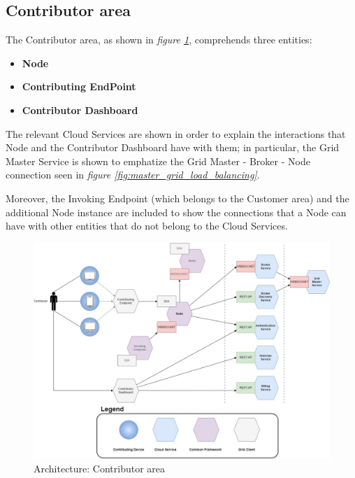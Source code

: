 \subsection{Contributor area}\label{contributor_area}
The Contributor area, as shown in \textit{figure \ref{fig:architecture_contributor}}, comprehends three entities:
\begin{itemize}
    \item \textbf{Node}
    \item \textbf{Contributing EndPoint}
    \item \textbf{Contributor Dashboard}
\end{itemize}
The relevant Cloud Services are shown in order to explain the interactions that Node and the Contributor Dashboard have with them; in particular, the Grid Master Service is shown to emphatize the Grid Master - Broker - Node connection seen in \textit{figure \ref{fig:master_grid_load_balancing}}.

Moreover, the Invoking Endpoint (which belongs to the Customer area) and the additional Node instance are included to show the connections that a Node can have with other entities that do not belong to the Cloud Services.

\vspace{5mm}

\begin{figure}[!ht]
    \centering
    \includegraphics[width=\linewidth]{document/chapters/chapter_6/images/architecture_contributor.jpg}
    \caption{Architecture: Contributor area}
    \label{fig:architecture_contributor}
\end{figure}

